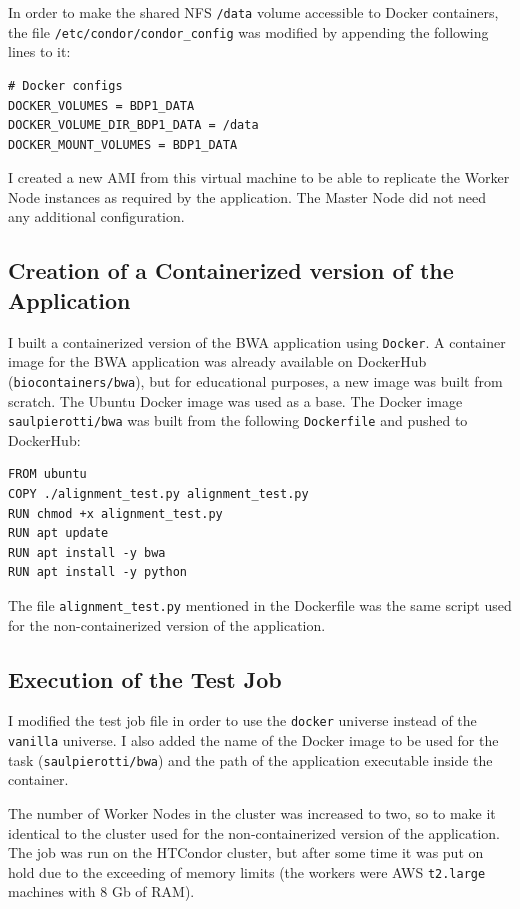 \documentclass{article}
\begin{document}
In order to make the shared NFS \texttt{/data} volume accessible to Docker containers, the file \texttt{/etc/condor/condor\_config} was modified by appending the following lines to it:
\begin{lstlisting}
# Docker configs
DOCKER_VOLUMES = BDP1_DATA
DOCKER_VOLUME_DIR_BDP1_DATA = /data
DOCKER_MOUNT_VOLUMES = BDP1_DATA
\end{lstlisting}

I created a new AMI from this virtual machine to be able to replicate the Worker Node instances as required by the application.
The Master Node did not need any additional configuration.

\subsection{Creation of a Containerized version of the Application}
I built a containerized version of the BWA application using \texttt{Docker}.
A container image for the BWA application was already available on DockerHub (\texttt{biocontainers/bwa}), but for educational purposes, a new image was built from scratch.
The Ubuntu Docker image was used as a base.
The Docker image \texttt{saulpierotti/bwa} was built from the following \texttt{Dockerfile} and pushed to DockerHub:

\begin{lstlisting}
FROM ubuntu
COPY ./alignment_test.py alignment_test.py
RUN chmod +x alignment_test.py
RUN apt update
RUN apt install -y bwa
RUN apt install -y python
\end{lstlisting}

The file \texttt{alignment\_test.py} mentioned in the Dockerfile was the same script used for the non-containerized version of the application.

\subsection{Execution of the Test Job}
I modified the test job file in order to use the \texttt{docker} universe instead of the \texttt{vanilla} universe.
I also added the name of the Docker image to be used for the task (\texttt{saulpierotti/bwa}) and the path of the application executable inside the container.



The number of Worker Nodes in the cluster was increased to two, so to make it identical to the cluster used for the non-containerized version of the application.
The job was run on the HTCondor cluster, but after some time it was put on hold due to the exceeding of memory limits (the workers were AWS \texttt{t2.large} machines with 8 Gb of RAM).
\end{document}
